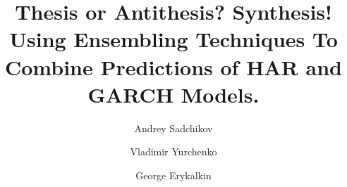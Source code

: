 \title{
Thesis or Antithesis? Synthesis! \\
Using Ensembling Techniques To Combine Predictions of HAR and GARCH Models.
}
%
%
\author{Andrey Sadchikov\and
Vladimir Yurchenko\and
George Erykalkin
}
%
%
